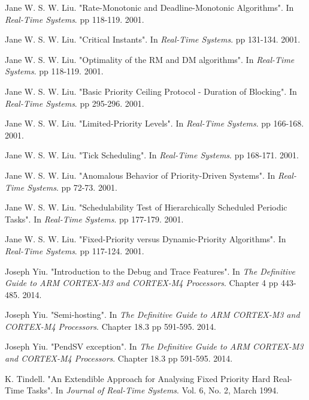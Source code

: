 \documentclass{article}
\begin{document}
\begin{thebibliography}{1}
Jane W. S. W. Liu.
\newblock "Rate-Monotonic and Deadline-Monotonic Algorithms".
\newblock In {\em Real-Time Systems}. pp 118-119. 2001.

Jane W. S. W. Liu.
\newblock "Critical Instants".
\newblock In {\em Real-Time Systems}. pp 131-134. 2001.

Jane W. S. W. Liu.
\newblock "Optimality of the RM and DM algorithms".
\newblock In {\em Real-Time Systems}. pp 118-119. 2001.

Jane W. S. W. Liu.
\newblock "Basic Priority Ceiling Protocol - Duration of Blocking".
\newblock In {\em Real-Time Systems}. pp 295-296. 2001.

Jane W. S. W. Liu.
\newblock "Limited-Priority Levels".
\newblock In {\em Real-Time Systems}. pp 166-168. 2001.

Jane W. S. W. Liu.
\newblock "Tick Scheduling".
\newblock In {\em Real-Time Systems}. pp 168-171. 2001.

Jane W. S. W. Liu.
\newblock "Anomalous Behavior of Priority-Driven Systems".
\newblock In {\em Real-Time Systems}. pp 72-73. 2001.

Jane W. S. W. Liu.
\newblock "Schedulability Test of Hierarchically Scheduled Periodic Tasks".
\newblock In {\em Real-Time Systems}. pp 177-179. 2001.

Jane W. S. W. Liu.
\newblock "Fixed-Priority versus Dynamic-Priority Algorithms".
\newblock In {\em Real-Time Systems}. pp 117-124. 2001.

Joseph Yiu.
\newblock "Introduction to the Debug and Trace Features".
\newblock In {\em The Definitive Guide to ARM CORTEX-M3 and CORTEX-M4 Processors}. Chapter 4 pp 443-485. 2014.

Joseph Yiu.
\newblock "Semi-hosting".
\newblock In {\em The Definitive Guide to ARM CORTEX-M3 and CORTEX-M4 Processors}. Chapter 18.3 pp 591-595. 2014.

Joseph Yiu.
\newblock "PendSV exception".
\newblock In {\em The Definitive Guide to ARM CORTEX-M3 and CORTEX-M4 Processors}. Chapter 18.3 pp 591-595. 2014.

K. Tindell.
\newblock "An Extendible Approach for Analysing Fixed Priority Hard Real-Time Tasks".
\newblock In {\em Journal of Real-Time Systems}. Vol. 6, No. 2, March 1994.


\end{thebibliography}
\end{document}
